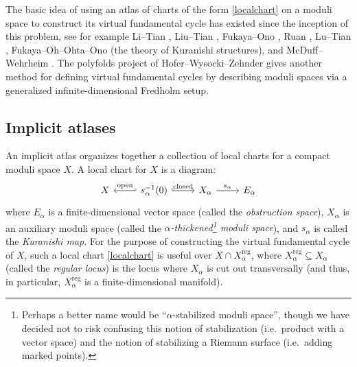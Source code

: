 \documentclass[12pt]{article}
\theoremstyle{definition}
\theoremstyle{remark}
\numberwithin{equation}{subsection}
\newcommand{\reg}{\mathrm{reg}}
\begin{document}
The basic idea of using an atlas of charts of the form \eqref{localchart} on a moduli space to construct its virtual fundamental cycle has existed since the inception of this problem, see for example Li--Tian \cite{litianII}, Liu--Tian \cite{liutian}, Fukaya--Ono \cite{fukayaono}, Ruan \cite{ruan}, Lu--Tian \cite{lutian}, Fukaya--Oh--Ohta--Ono \cite{FOOOI,FOOOII,foootechnicaldetails,fooonewI} (the theory of Kuranishi structures), and McDuff--Wehrheim \cite{mcduffwehrheim,mcduffnotes}.  The polyfolds project of Hofer--Wysocki--Zehnder \cite{polyfoldI,polyfoldII,polyfoldIII,polyfoldint,polyfoldscnew,polyfoldbookI,polyfoldGW} gives another method for defining virtual fundamental cycles by describing moduli spaces via a generalized infinite-dimensional Fredholm setup.

\subsection{Implicit atlases}

An implicit atlas organizes together a collection of local charts for a compact moduli space $X$.  A local chart for $X$ is a diagram:
\begin{equation}\label{localchart}
\begin{tikzcd}
X\ar[hookleftarrow]{r}{\text{open}}&s_\alpha^{-1}(0)\ar[hook]{r}{\text{closed}}&X_\alpha\ar{r}{s_\alpha}&E_\alpha
\end{tikzcd}
\end{equation}
where $E_\alpha$ is a finite-dimensional vector space (called the \emph{obstruction space}), $X_\alpha$ is an auxiliary moduli space (called the \emph{$\alpha$-thickened\footnote{Perhaps a better name would be ``$\alpha$-stabilized moduli space'', though we have decided not to risk confusing this notion of stabilization (i.e.\ product with a vector space) and the notion of stabilizing a Riemann surface (i.e.\ adding marked points).} moduli space}), and $s_\alpha$ is called the \emph{Kuranishi map}.  For the purpose of constructing the virtual fundamental cycle of $X$, such a local chart \eqref{localchart} is useful over $X\cap X_\alpha^\reg$, where $X_\alpha^\reg\subseteq X_\alpha$ (called the \emph{regular locus}) is the locus where $X_\alpha$ is cut out transversally (and thus, in particular, $X_\alpha^\reg$ is a finite-dimensional manifold).
\end{document}
